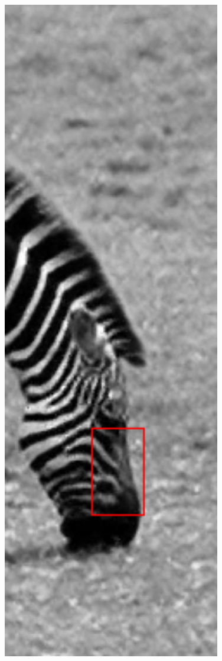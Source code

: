 \documentclass[review,numbers,sort&compress]{elsarticle}  %
\begin{document}
\begin{figure}[t]
{\begin{minipage}[b]{0.15\textwidth}
                \includegraphics[width=1\textwidth]{compareImage/zebra_crop_G_OUR.png} \\

\end{minipage}}
\end{figure}
\end{document}
